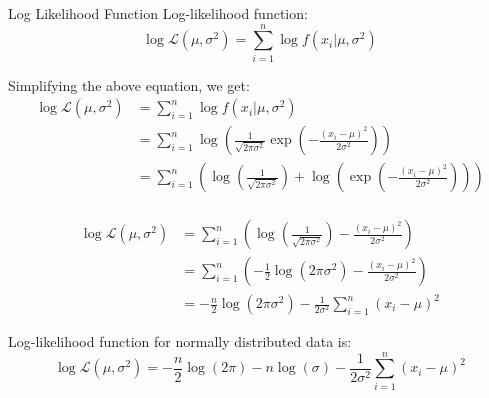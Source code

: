 \documentclass{beamer}
\begin{document}
\begin{frame}{Log Likelihood Function}
    Log-likelihood function:
    \begin{equation}
        \log \mathcal{L}(\mu, \sigma^2) = \sum_{i=1}^n \log f(x_i|\mu, \sigma^2)
    \end{equation}

    Simplifying the above equation, we get:
    \begin{align*}
        \log \mathcal{L}(\mu, \sigma^2) &= \sum_{i=1}^n \log f(x_i|\mu, \sigma^2) \\
        &= \sum_{i=1}^n \log \left( \frac{1}{\sqrt{2\pi\sigma^2}} \exp \left( -\frac{(x_i-\mu)^2}{2\sigma^2} \right) \right) \\
        &= \sum_{i=1}^n \left( \log \left( \frac{1}{\sqrt{2\pi\sigma^2}} \right) + \log \left( \exp \left( -\frac{(x_i-\mu)^2}{2\sigma^2} \right) \right) \right) \\
        \end{align*}
\end{frame}

\begin{frame}
   
    \begin{align*}
        \log \mathcal{L}(\mu, \sigma^2) &= \sum_{i=1}^n \left( \log \left( \frac{1}{\sqrt{2\pi\sigma^2}} \right) -\frac{(x_i-\mu)^2}{2\sigma^2} \right) \\
        &= \sum_{i=1}^n \left( -\frac{1}{2} \log (2\pi\sigma^2) -\frac{(x_i-\mu)^2}{2\sigma^2} \right) \\
        &= -\frac{n}{2} \log (2\pi\sigma^2) - \frac{1}{2\sigma^2} \sum_{i=1}^n (x_i-\mu)^2
        \end{align*}
        \begin{tcolorbox}[colback=metropolisblue!5,colframe=metropolisblue,title=Log Likelihood Function for Univariate Normal Distribution]
            Log-likelihood function for normally distributed data is:
            \[
                \log \mathcal{L}(\mu, \sigma^2) = -\frac{n}{2} \log(2\pi) - n\log(\sigma) - \frac{1}{2\sigma^2} \sum_{i=1}^n (x_i-\mu)^2
                \]
        \end{tcolorbox}
\end{frame}
\end{document}
